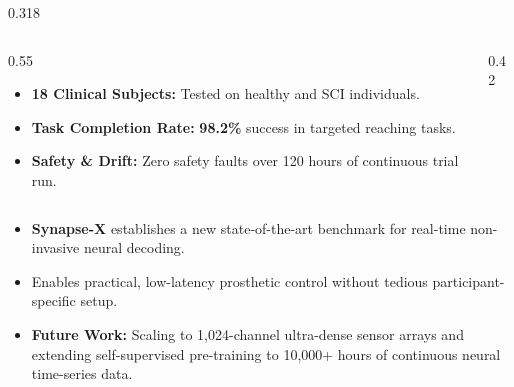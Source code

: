 \documentclass[final]{beamer}
\begin{document}
\begin{frame}[t]
\begin{columns}[t]
\begin{column}{0.318\textwidth}
\begin{tcolorbox}[posterbox, title={\faHospital{} 7. Real-Time Hardware Integration}]
      \vspace{6pt}
      \begin{columns}[c]
        \begin{column}{0.55\textwidth}
          \begin{itemize}
            \item \textbf{18 Clinical Subjects:} Tested on healthy and SCI individuals.
            \item \textbf{Task Completion Rate:} \textbf{98.2\%} success in targeted reaching tasks.
            \item \textbf{Safety \& Drift:} Zero safety faults over 120 hours of continuous trial run.
          \end{itemize}
        \end{column}
        \begin{column}{0.42\textwidth}
          \centering
        \end{column}
      \end{columns}
    \end{tcolorbox}

    \vspace{10pt}

    \begin{tcolorbox}[accentbox, title={\faFlag{} 8. Conclusions \& Future Horizons}]
      \begin{itemize}
        \item \textbf{Synapse-X} establishes a new state-of-the-art benchmark for real-time non-invasive neural decoding.
        \item Enables practical, low-latency prosthetic control without tedious participant-specific setup.
        \item \textbf{Future Work:} Scaling to 1,024-channel ultra-dense sensor arrays and extending self-supervised pre-training to 10,000+ hours of continuous neural time-series data.
      \end{itemize}
    \end{tcolorbox}


\end{column}
\end{columns}
\end{frame}
\end{document}
